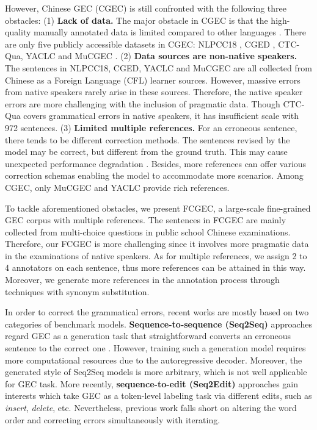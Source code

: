 \documentclass[11pt]{article}
\begin{document}
However, Chinese GEC (CGEC) is still confronted with the following three obstacles: (1) \textbf{Lack of data.} The major obstacle in CGEC is that the high-quality manually annotated data is limited compared to other languages \cite{dahlmeier2013building,napoles2017jfleg,rozovskaya2019grammar,bryant2019bea,flachs2020grammatical,trinh2021new}. There are only five publicly accessible datasets in CGEC: NLPCC18 \cite{zhao2018overview} , CGED \cite{rao2020overview}, CTC-Qua, YACLC \cite{wang2021yaclc} and MuCGEC \cite{zhang2022mucgec}. (2) \textbf{Data sources are non-native speakers.} The sentences in NLPCC18, CGED, YACLC and MuCGEC are all collected from Chinese as a Foreign Language (CFL) learner sources. However, massive errors from native speakers rarely arise in these sources. Therefore, the native speaker errors are more challenging with the inclusion of pragmatic data. Though CTC-Qua covers grammatical errors in native speakers, it has insufficient scale with 972 sentences. (3) \textbf{Limited multiple references.} For an erroneous sentence, there tends to be different correction methods. The sentences revised by the model may be correct, but different from the ground truth. This may cause unexpected performance degradation \cite{bryant2015far}. Besides, more references can offer various correction schemas enabling the model to accommodate more scenarios. Among CGEC, only MuCGEC and YACLC provide rich references.

To tackle aforementioned obstacles, we present FCGEC, a large-scale fine-grained GEC corpus with  multiple  references. The sentences in FCGEC are mainly collected from multi-choice questions in public school Chinese examinations. Therefore, our FCGEC is more challenging since it involves more pragmatic data in the examinations of native speakers. As for multiple references, we assign 2 to 4 annotators on each sentence, thus more references can be attained in this way. Moreover, we generate more references in the annotation process through techniques with synonym substitution.

In order to correct the grammatical errors, recent works are mostly based on two categories of benchmark models. \textbf{Sequence-to-sequence (Seq2Seq)} approaches regard GEC as a generation task that straightforward converts an erroneous sentence to the correct one \cite{yuan2016grammatical,zhao2020maskgec,fu2018youdao}. However, training such a generation model requires more computational resources due to the autoregressive decoder. Moreover, the generated style of Seq2Seq models is more arbitrary, which is not well applicable for GEC task. More recently, \textbf{sequence-to-edit (Seq2Edit)} approaches gain interests which take GEC as a token-level labeling task \cite{awasthi2019parallel,omelianchuk2020gector} via different edits, such as \emph{insert}, \emph{delete}, etc. Nevertheless, previous work falls short on altering the word order and correcting errors simultaneously with iterating.
\end{document}
